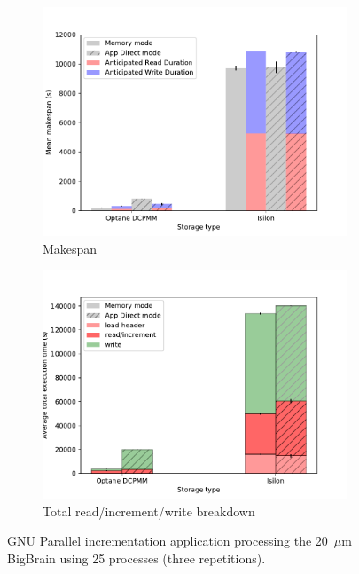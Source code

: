 \begin{figure}
    \begin{subfigure}{0.5\textwidth}
        \centering
    \includegraphics[width=\columnwidth]{figures/optane/makespan-real-20bb_25cpus.pdf}
    \caption{Makespan}\label{fig:optane:20mksp25}
\end{subfigure}
\begin{subfigure}{0.5\textwidth}
        \centering
    \includegraphics[width=\columnwidth]{figures/optane/stacked-real-20bb_25cpus.pdf}
    \caption{Total read/increment/write breakdown}\label{fig:optane:20total25}
\end{subfigure}
\captionsetup{belowskip=-10pt}
\caption{GNU Parallel incrementation application processing the 20~$\mu$m
BigBrain using 25 processes (three repetitions).}\label{fig:optane:2025}
\end{figure}

